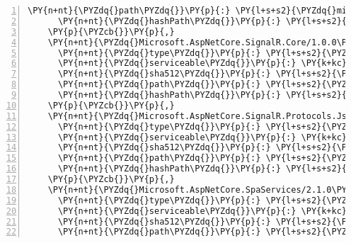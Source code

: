 \begin{Verbatim}[commandchars=\\\{\},numbers=left,firstnumber=1,stepnumber=1,numberblanklines=0]
      \PY{n+nt}{\PYZdq{}path\PYZdq{}}\PY{p}{:} \PY{l+s+s2}{\PYZdq{}microsoft.aspnetcore.signalr.common/1.0.0\PYZhy{}rc1\PYZhy{}final\PYZdq{}}\PY{p}{,}
      \PY{n+nt}{\PYZdq{}hashPath\PYZdq{}}\PY{p}{:} \PY{l+s+s2}{\PYZdq{}microsoft.aspnetcore.signalr.common.1.0.0\PYZhy{}rc1\PYZhy{}final.nupkg.sha512\PYZdq{}}
    \PY{p}{\PYZcb{}}\PY{p}{,}
    \PY{n+nt}{\PYZdq{}Microsoft.AspNetCore.SignalR.Core/1.0.0\PYZhy{}rc1\PYZhy{}final\PYZdq{}}\PY{p}{:} \PY{p}{\PYZob{}}
      \PY{n+nt}{\PYZdq{}type\PYZdq{}}\PY{p}{:} \PY{l+s+s2}{\PYZdq{}package\PYZdq{}}\PY{p}{,}
      \PY{n+nt}{\PYZdq{}serviceable\PYZdq{}}\PY{p}{:} \PY{k+kc}{true}\PY{p}{,}
      \PY{n+nt}{\PYZdq{}sha512\PYZdq{}}\PY{p}{:} \PY{l+s+s2}{\PYZdq{}sha512\PYZhy{}zZ3n30Z4vqO9BJXtfxJvAH7Cp9PGbUqcmZ2IzU524lnIHNd4TF6N/GZ7OT76A8S7HgyyUnRLrl6+jxLOJpB79Q==\PYZdq{}}\PY{p}{,}
      \PY{n+nt}{\PYZdq{}path\PYZdq{}}\PY{p}{:} \PY{l+s+s2}{\PYZdq{}microsoft.aspnetcore.signalr.core/1.0.0\PYZhy{}rc1\PYZhy{}final\PYZdq{}}\PY{p}{,}
      \PY{n+nt}{\PYZdq{}hashPath\PYZdq{}}\PY{p}{:} \PY{l+s+s2}{\PYZdq{}microsoft.aspnetcore.signalr.core.1.0.0\PYZhy{}rc1\PYZhy{}final.nupkg.sha512\PYZdq{}}
    \PY{p}{\PYZcb{}}\PY{p}{,}
    \PY{n+nt}{\PYZdq{}Microsoft.AspNetCore.SignalR.Protocols.Json/1.0.0\PYZhy{}rc1\PYZhy{}final\PYZdq{}}\PY{p}{:} \PY{p}{\PYZob{}}
      \PY{n+nt}{\PYZdq{}type\PYZdq{}}\PY{p}{:} \PY{l+s+s2}{\PYZdq{}package\PYZdq{}}\PY{p}{,}
      \PY{n+nt}{\PYZdq{}serviceable\PYZdq{}}\PY{p}{:} \PY{k+kc}{true}\PY{p}{,}
      \PY{n+nt}{\PYZdq{}sha512\PYZdq{}}\PY{p}{:} \PY{l+s+s2}{\PYZdq{}sha512\PYZhy{}kqcoHhQeoG9g23d8FdAORe5FxlaoNlzOFN23SmmXQEv3lkNv9+AeRlU76FKP8/5j5f0WFKmnflOr/kB1xHW+ag==\PYZdq{}}\PY{p}{,}
      \PY{n+nt}{\PYZdq{}path\PYZdq{}}\PY{p}{:} \PY{l+s+s2}{\PYZdq{}microsoft.aspnetcore.signalr.protocols.json/1.0.0\PYZhy{}rc1\PYZhy{}final\PYZdq{}}\PY{p}{,}
      \PY{n+nt}{\PYZdq{}hashPath\PYZdq{}}\PY{p}{:} \PY{l+s+s2}{\PYZdq{}microsoft.aspnetcore.signalr.protocols.json.1.0.0\PYZhy{}rc1\PYZhy{}final.nupkg.sha512\PYZdq{}}
    \PY{p}{\PYZcb{}}\PY{p}{,}
    \PY{n+nt}{\PYZdq{}Microsoft.AspNetCore.SpaServices/2.1.0\PYZhy{}rc1\PYZhy{}final\PYZdq{}}\PY{p}{:} \PY{p}{\PYZob{}}
      \PY{n+nt}{\PYZdq{}type\PYZdq{}}\PY{p}{:} \PY{l+s+s2}{\PYZdq{}package\PYZdq{}}\PY{p}{,}
      \PY{n+nt}{\PYZdq{}serviceable\PYZdq{}}\PY{p}{:} \PY{k+kc}{true}\PY{p}{,}
      \PY{n+nt}{\PYZdq{}sha512\PYZdq{}}\PY{p}{:} \PY{l+s+s2}{\PYZdq{}sha512\PYZhy{}0bHUyEJYtvR+ze8oOt0XKU4geyDXPXGttee5W6rxBQULBFYMWGZFeTAceANZWUcq//TiRvPAVlxhXa2PpT+eig==\PYZdq{}}\PY{p}{,}
      \PY{n+nt}{\PYZdq{}path\PYZdq{}}\PY{p}{:} \PY{l+s+s2}{\PYZdq{}microsoft.aspnetcore.spaservices/2.1.0\PYZhy{}rc1\PYZhy{}final\PYZdq{}}\PY{p}{,}

\end{Verbatim}

